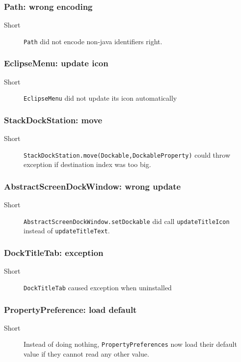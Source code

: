 \documentclass[a4paper,10pt]{article}
\newcommand{\src}[1]{\lstinline[basicstyle=\normalsize\ttfamily,keywordstyle=\normalsize\ttfamily,identifierstyle=\normalsize\ttfamily]|#1|}
\newcommand{\short}{\item[Short]}
\begin{document}
\subsubsection{Path: wrong encoding}
\begin{description}
 \short \src{Path} did not encode non-java identifiers right.
\end{description}

\subsubsection{EclipseMenu: update icon}
\begin{description}
 \short \src{EclipseMenu} did not update its icon automatically
\end{description}

\subsubsection{StackDockStation: move}
\begin{description}
 \short \src{StackDockStation.move(Dockable,DockableProperty)} could throw \linebreak exception if destination index was too big.
\end{description}


\subsubsection{AbstractScreenDockWindow: wrong update}
\begin{description}
 \short \src{AbstractScreenDockWindow.setDockable} did call \src{updateTitleIcon} instead of \src{updateTitleText}.
\end{description}

\subsubsection{DockTitleTab: exception}
\begin{description}
 \short \src{DockTitleTab} caused exception when uninstalled
\end{description}


\subsubsection{PropertyPreference: load default}
\begin{description}
 \short Instead of doing nothing, \src{PropertyPreferences} now load their default value if they cannot read any other value.
\end{description}
\end{document}
